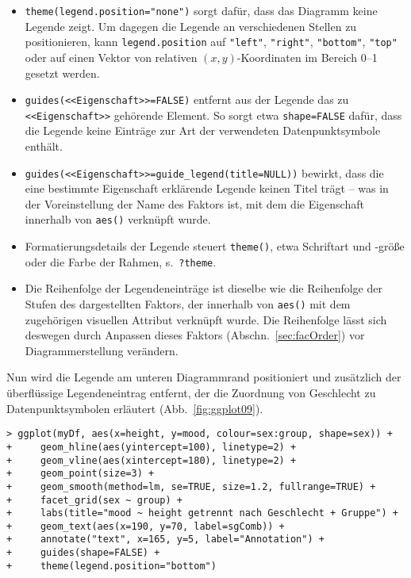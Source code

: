 \begin{itemize}
\item \lstinline!theme(legend.position="none")! sorgt dafür, dass das Diagramm keine Legende zeigt. Um dagegen die Legende an verschiedenen Stellen zu positionieren, kann \lstinline!legend.position! auf \lstinline!"left"!, \lstinline!"right"!, \lstinline!"bottom"!, \lstinline!"top"! oder auf einen Vektor von relativen $(x,y)$-Koordinaten im Bereich 0--1 gesetzt werden.
\item {} \lstinline!guides(<<Eigenschaft>>=FALSE)! entfernt aus der Legende das zu \lstinline!<<Eigenschaft>>! gehörende Element. So sorgt etwa \lstinline!shape=FALSE! dafür, dass die Legende keine Einträge zur Art der verwendeten Datenpunktsymbole enthält.
\item \lstinline!guides(<<Eigenschaft>>=guide_legend(title=NULL))! bewirkt, dass die eine bestimmte Eigenschaft erklärende Legende keinen Titel trägt -- was in der Voreinstellung der Name des Faktors ist, mit dem die Eigenschaft innerhalb von \lstinline!aes()! verknüpft wurde.
\item Formatierungsdetails der Legende steuert \lstinline!theme()!, etwa Schriftart und -größe oder die Farbe der Rahmen, s.\ \lstinline!?theme!.
\item Die Reihenfolge der Legendeneinträge ist dieselbe wie die Reihenfolge der Stufen des dargestellten Faktors, der innerhalb von \lstinline!aes()! mit dem zugehörigen visuellen Attribut verknüpft wurde. Die Reihenfolge lässt sich deswegen durch Anpassen dieses Faktors (Abschn.\ \ref{sec:facOrder}) vor Diagrammerstellung verändern. %
\end{itemize}

Nun wird die Legende am unteren Diagrammrand positioniert und zusätzlich der überflüssige Legendeneintrag entfernt, der die Zuordnung von Geschlecht zu Datenpunktsymbolen erläutert (Abb.\ \ref{fig:ggplot09}).
\begin{lstlisting}
> ggplot(myDf, aes(x=height, y=mood, colour=sex:group, shape=sex)) +
+     geom_hline(aes(yintercept=100), linetype=2) +
+     geom_vline(aes(xintercept=180), linetype=2) +
+     geom_point(size=3) +
+     geom_smooth(method=lm, se=TRUE, size=1.2, fullrange=TRUE) +
+     facet_grid(sex ~ group) +
+     labs(title="mood ~ height getrennt nach Geschlecht + Gruppe") +
+     geom_text(aes(x=190, y=70, label=sgComb)) +
+     annotate("text", x=165, y=5, label="Annotation") +
+     guides(shape=FALSE) +
+     theme(legend.position="bottom")
\end{lstlisting}

